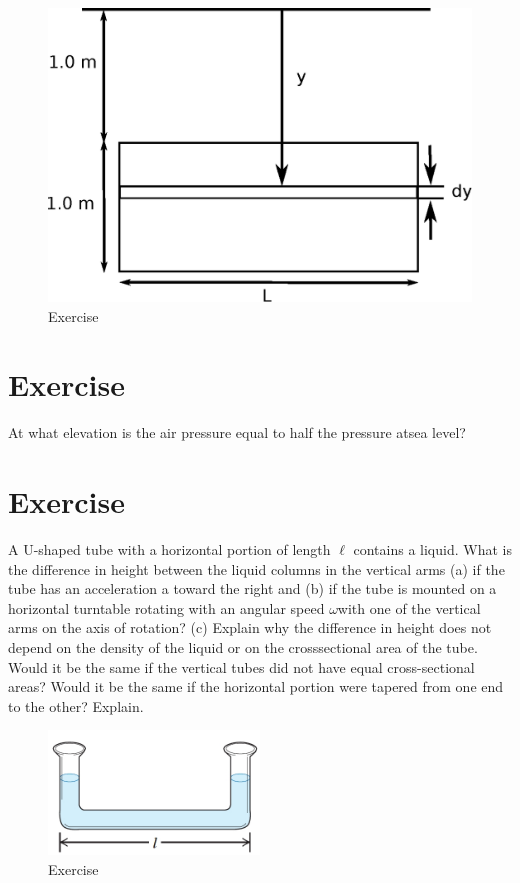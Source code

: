 \documentclass[12pt]{article}
\begin{document}
\begin{figure}[h!]
  \begin{center}
    \includegraphics[height=2.in]{images/example2.eps}
    \caption{Exercise \theexample }
    \label{2}
  \end{center}
\end{figure}


\section*{Exercise \theexample}



At what elevation is the air pressure equal to half the pressure atsea level?



\section*{Exercise \theexample}


A U-shaped
tube with a horizontal portion of
length $\ell$ contains
a liquid. What is the difference
in height between the liquid
columns in the vertical arms (a)
if the tube has an acceleration a
toward the right and (b) if the
tube is mounted on a horizontal
turntable rotating with an angular speed $\omega$with one of the vertical
arms on the axis of rotation? (c) Explain why the difference in
height does not depend on the density of the liquid or on the crosssectional
area of the tube. Would it be the same if the vertical tubes
did not have equal cross-sectional areas? Would it be the same if the
horizontal portion were tapered from one end to the other? Explain.

\begin{figure}[h!]
  \begin{center}
  \includegraphics[height=1.3in]{images/example_12.85.jpg}
  \caption{Exercise \theexample }
  \label{3}
\end{center}
\end{figure}
\end{document}
